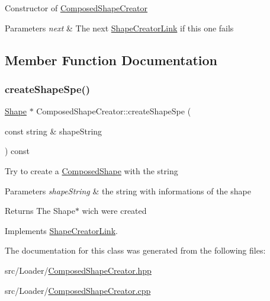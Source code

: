 Constructor of \hyperlink{class_composed_shape_creator}{Composed\+Shape\+Creator} 
\begin{DoxyParams}{Parameters}
{\em next} & The next \hyperlink{class_shape_creator_link}{Shape\+Creator\+Link} if this one fails \\
\hline
\end{DoxyParams}


\subsection{Member Function Documentation}
\hypertarget{class_composed_shape_creator_a5a1ebce5d0d7509923e70d507dc57ff2}{}\label{class_composed_shape_creator_a5a1ebce5d0d7509923e70d507dc57ff2} 
\subsubsection{\texorpdfstring{create\+Shape\+Spe()}{createShapeSpe()}}
{\footnotesize\ttfamily \hyperlink{class_shape}{Shape} $\ast$ Composed\+Shape\+Creator\+::create\+Shape\+Spe (\begin{DoxyParamCaption}\item[{const string \&}]{shape\+String }\end{DoxyParamCaption}) const\hspace{0.3cm}{\ttfamily [virtual]}}

Try to create a \hyperlink{class_composed_shape}{Composed\+Shape} with the string 
\begin{DoxyParams}{Parameters}
{\em shape\+String} & the string with informations of the shape \\
\hline
\end{DoxyParams}
\begin{DoxyReturn}{Returns}
The Shape$\ast$ wich were created 
\end{DoxyReturn}


Implements \hyperlink{class_shape_creator_link_a036ecc845946d23b36335e9077308bcf}{Shape\+Creator\+Link}.



The documentation for this class was generated from the following files\+:\begin{DoxyCompactItemize}
\item 
src/\+Loader/\hyperlink{_composed_shape_creator_8hpp}{Composed\+Shape\+Creator.\+hpp}\item 
src/\+Loader/\hyperlink{_composed_shape_creator_8cpp}{Composed\+Shape\+Creator.\+cpp}\end{DoxyCompactItemize}

